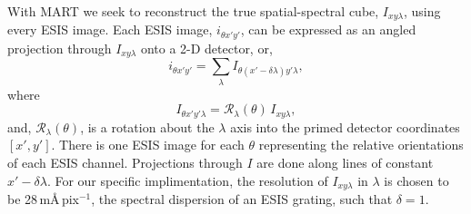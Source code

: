 	
	With MART we seek to reconstruct the true spatial-spectral cube, $I_{xy\lambda}$, using every ESIS image.
	Each ESIS image, $i_{\theta x'y'}$, can be expressed as an angled projection through $I_{xy\lambda}$ onto a 2-D detector, or,
	\begin{equation}
	    i_{\theta x'y'} = \sum_\lambda I_{\theta(x'-\delta\lambda)y'\lambda},
	\end{equation}
	where
	\begin{equation}
		I_{\theta x'y'\lambda} = \mathcal{R}_\lambda(\theta)\,I_{xy\lambda},
	\end{equation} 
	and, $\mathcal{R}_\lambda (\theta)$, is a rotation about the $\lambda$ axis into the primed detector coordinates $[x',y']$.
	There is one ESIS image for each $\theta$ representing the relative orientations of each ESIS channel.
	Projections through $I$ are done along lines of constant $x'-\delta\lambda$.
	For our specific implimentation, the resolution of $I_{xy\lambda}$ in $\lambda$ is chosen to be 28\,m\AA\,pix$^{-1}$, the spectral dispersion of an ESIS grating, such that $\delta = 1$. 

